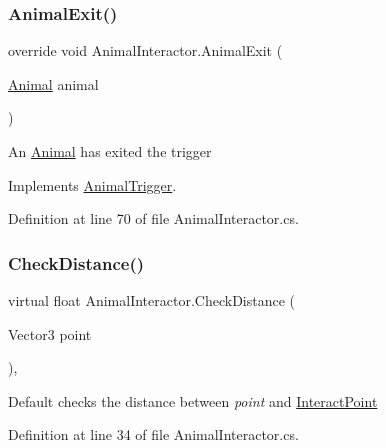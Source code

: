 \subsubsection{\texorpdfstring{Animal\+Exit()}{AnimalExit()}}
{\footnotesize\ttfamily override void Animal\+Interactor.\+Animal\+Exit (\begin{DoxyParamCaption}\item[{\mbox{\hyperlink{class_animal}{Animal}}}]{animal }\end{DoxyParamCaption})\hspace{0.3cm}{\ttfamily [virtual]}}



An \mbox{\hyperlink{class_animal}{Animal}} has exited the trigger 



Implements \mbox{\hyperlink{class_animal_trigger_aa1a7c2e90de76c2e089b2bae01813f5c}{Animal\+Trigger}}.



Definition at line 70 of file Animal\+Interactor.\+cs.

\mbox{\label{class_animal_interactor_a2ad1cb30f205eb70a693ab12f7c635af}} 
\subsubsection{\texorpdfstring{Check\+Distance()}{CheckDistance()}}
{\footnotesize\ttfamily virtual float Animal\+Interactor.\+Check\+Distance (\begin{DoxyParamCaption}\item[{Vector3}]{point }\end{DoxyParamCaption})\hspace{0.3cm}{\ttfamily [protected]}, {\ttfamily [virtual]}}



Default checks the distance between {\itshape point}  and \mbox{\hyperlink{class_animal_interactor_abad93e377f12a32e8b96e0285c7fc1b2}{Interact\+Point}} 



Definition at line 34 of file Animal\+Interactor.\+cs.

\mbox{\label{class_animal_interactor_a12da79f6eb050c54043ff783e7c2a725}} 
